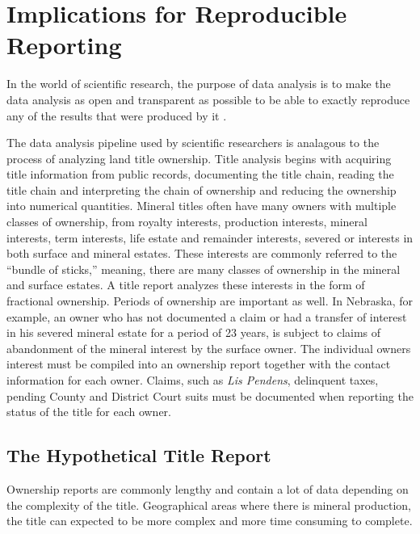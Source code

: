 \documentclass[
]{book}
\begin{document}
\hypertarget{implications-for-reproducible-reporting}{%
\chapter{Implications for Reproducible Reporting}\label{implications-for-reproducible-reporting}}

In the world of scientific research, the purpose of data analysis is to make the data analysis as open and transparent as possible to be able to exactly reproduce any of the results that were produced by it \citep{andrewsChapterReproducibleData}.

The data analysis pipeline used by scientific researchers is analagous to the process of analyzing land title ownership. Title analysis begins with acquiring title information from public records, documenting the title chain, reading the title chain and interpreting the chain of ownership and reducing the ownership into numerical quantities. Mineral titles often have many owners with multiple classes of ownership, from royalty interests, production interests, mineral interests, term interests, life estate and remainder interests, severed or interests in both surface and mineral estates. These interests are commonly referred to the ``bundle of sticks,'' meaning, there are many classes of ownership in the mineral and surface estates. A title report analyzes these interests in the form of fractional ownership. Periods of ownership are important as well. In Nebraska, for example, an owner who has not documented a claim or had a transfer of interest in his severed mineral estate for a period of 23 years, is subject to claims of abandonment of the mineral interest by the surface owner. The individual owners interest must be compiled into an ownership report together with the contact information for each owner. Claims, such as \emph{Lis Pendens}, delinquent taxes, pending County and District Court suits must be documented when reporting the status of the title for each owner.

\hypertarget{the-hypothetical-title-report}{%
\section{The Hypothetical Title Report}\label{the-hypothetical-title-report}}

Ownership reports are commonly lengthy and contain a lot of data depending on the complexity of the title. Geographical areas where there is mineral production, the title can expected to be more complex and more time consuming to complete.
\end{document}
